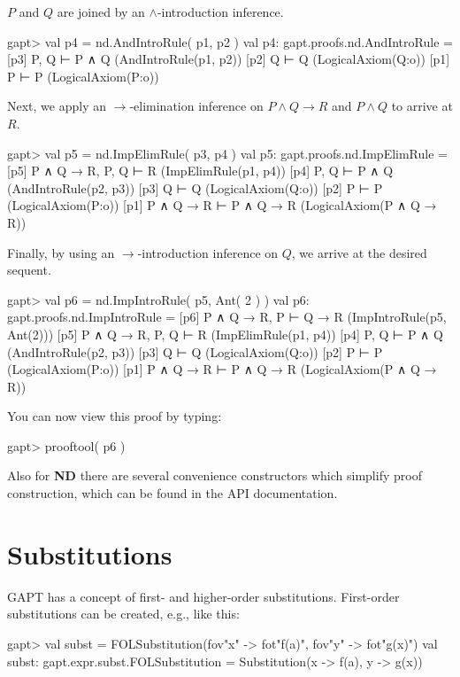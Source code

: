 \documentclass[a4paper,11pt]{book}
\newcommand{\impl}{\to} %
\renewcommand{\land}{\wedge}
\newcommand{\ND}{\textbf{ND}}
\begin{document}
$P$ and $Q$ are joined by an $\land$-introduction inference.

\begin{clilisting}
gapt> val p4 = nd.AndIntroRule( p1, p2 )
val p4: gapt.proofs.nd.AndIntroRule = [p3] P, Q ⊢ P ∧ Q    (AndIntroRule(p1, p2))
[p2] Q ⊢ Q    (LogicalAxiom(Q:o))
[p1] P ⊢ P    (LogicalAxiom(P:o))

\end{clilisting}

Next, we apply an $\impl$-elimination inference on $P \land Q \impl R$
and $P \land Q$ to arrive at $R$.

\begin{clilisting}
gapt> val p5 = nd.ImpElimRule( p3, p4 )
val p5: gapt.proofs.nd.ImpElimRule = [p5] P ∧ Q → R, P, Q ⊢ R    (ImpElimRule(p1, p4))
[p4] P, Q ⊢ P ∧ Q    (AndIntroRule(p2, p3))
[p3] Q ⊢ Q    (LogicalAxiom(Q:o))
[p2] P ⊢ P    (LogicalAxiom(P:o))
[p1] P ∧ Q → R ⊢ P ∧ Q → R    (LogicalAxiom(P ∧ Q → R))

\end{clilisting}

Finally, by using an $\impl$-introduction inference on $Q$, we arrive
at the desired sequent.

\begin{clilisting}
gapt> val p6 = nd.ImpIntroRule( p5, Ant( 2 ) )
val p6: gapt.proofs.nd.ImpIntroRule = [p6] P ∧ Q → R, P ⊢ Q → R    (ImpIntroRule(p5, Ant(2)))
[p5] P ∧ Q → R, P, Q ⊢ R    (ImpElimRule(p1, p4))
[p4] P, Q ⊢ P ∧ Q    (AndIntroRule(p2, p3))
[p3] Q ⊢ Q    (LogicalAxiom(Q:o))
[p2] P ⊢ P    (LogicalAxiom(P:o))
[p1] P ∧ Q → R ⊢ P ∧ Q → R    (LogicalAxiom(P ∧ Q → R))

\end{clilisting}

You can now view this proof by typing:
\begin{clilisting}
gapt> prooftool( p6 )

\end{clilisting}

Also for {\ND} there are several convenience constructors which simplify proof
construction, which can be found in the API documentation.

\section{Substitutions}

GAPT has a concept of first- and higher-order substitutions.
First-order substitutions can be created, e.g., like this:
\begin{clilisting}
gapt> val subst = FOLSubstitution(fov"x" -> fot"f(a)", fov"y" -> fot"g(x)")
val subst: gapt.expr.subst.FOLSubstitution = Substitution(x -> f(a), y -> g(x))

\end{clilisting}
\end{document}
